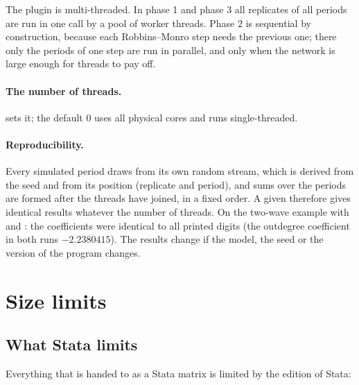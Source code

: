 The plugin is multi-threaded. In phase 1 and phase 3 all replicates of all periods are run in one call by a pool of worker threads. Phase 2 is sequential by construction, because each Robbins--Monro step needs the previous one; there only the periods of one step are run in parallel, and only when the network is large enough for threads to pay off.

\paragraph{The number of threads.}  sets it; the default 0 uses all physical cores and  runs single-threaded.

\paragraph{Reproducibility.} Every simulated period draws from its own random stream, which is derived from the seed and from its position (replicate and period), and sums over the periods are formed after the threads have joined, in a fixed order. A given  therefore gives identical results whatever the number of threads. On the two-wave example with  and : the coefficients were identical to all printed digits (the outdegree coefficient in both runs $-2.2380415$). The results change if the model, the seed or the version of the program changes.

\section{Size limits}\label{sec:limits}

\subsection{What Stata limits}

Everything that is handed to \nwsaom{} as a Stata matrix is limited by the edition of Stata:

